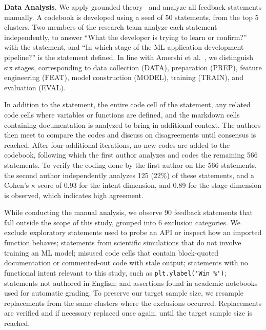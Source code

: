 \documentclass[a4paper,USenglish,cleveref,autoref,thm-restate,anonymous]{lipics-v2021}       %
\begin{document}
\textbf{Data Analysis}.
We apply grounded theory~\cite{seaman1999qualitative}
and analyze all feedback statements manually.
A codebook is developed using a seed of 50 statements,
from the top 5 clusters.
Two members of the research team analyze each statement independently,
to answer ``What the developer is trying to learn or confirm?'' with the statement,
and ``In which stage of the ML application development pipeline?'' is the statement defined.
In line with Amershi et al.~\cite{amershi2019software},
we distinguish six stages,
corresponding to data collection (DATA),
preparation (PREP),
feature engineering (FEAT),
model construction (MODEL),
training (TRAIN),
and evaluation (EVAL).

In addition to the statement,
the entire code cell of the statement,
any related code cells where variables or functions are defined,
and the markdown cells containing documentation is analyzed to bring in additional context.
The authors then meet to compare the codes and discuss on disagreements
until consensus is reached.
After four additional iterations, no new codes are added to the codebook,
following which
the first author analyzes and codes the remaining 566 statements.
To verify the coding done by the first author on the 566 statements,
the second author independently analyzes 125 (22\%) of these statements,
and a Cohen's $\kappa$ score of 0.93 for the intent dimension,
and 0.89 for the stage dimension is observed,
which indicates high agreement.

While conducting the manual analysis,
we observe 90 feedback statements that fall outside the scope of this study,
grouped into 6 exclusion categories.
We exclude exploratory statements
used to probe an API
or inspect how an imported function behaves;
statements from scientific simulations
that do not involve training an ML model;
misused code cells
that contain block-quoted documentation
or commented-out code with stale output;
statements with no functional intent relevant to this study,
such as \lstinline{plt.ylabel('Win %')};
statements not authored in English;
and assertions found in academic notebooks used for automatic grading.
To preserve our target sample size,
we resample replacements from the same clusters where the exclusions occurred.
Replacements are verified
and if necessary replaced once again,
until the target sample size is reached.
\end{document}

